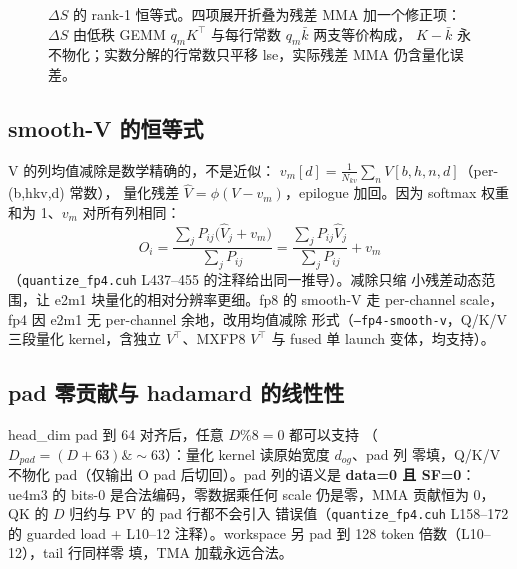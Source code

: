 \begin{figure}[H]
\caption{$\Delta S$ 的 rank-1 恒等式。四项展开折叠为残差 MMA 加一个修正项：
$\Delta S$ 由低秩 GEMM $q_mK^{\top}$ 与每行常数 $q_m\bar k$ 两支等价构成，
$K-\bar k$ 永不物化；实数分解的行常数只平移 lse，实际残差 MMA 仍含量化误差。}
\label{fig:31-deltas}
\end{figure}

\subsection{smooth-V 的恒等式}

V 的列均值减除是数学精确的，不是近似：
$v_m[d]=\frac{1}{N_{kv}}\sum_n V[b,h,n,d]$（per-(b,hkv,d) 常数），
量化残差 $\hat V=\phi(V-v_m)$，epilogue 加回。因为 softmax 权重和为
1、$v_m$ 对所有列相同：
\begin{equation}
  O_i=\frac{\sum_j P_{ij}\bigl(\hat V_j+v_m\bigr)}{\sum_j P_{ij}}
  =\frac{\sum_j P_{ij}\hat V_j}{\sum_j P_{ij}}+v_m
  \label{eq:31-smoothv}
\end{equation}
（\texttt{quantize\_fp4.cuh} L437--455 的注释给出同一推导）。减除只缩
小残差动态范围，让 e2m1 块量化的相对分辨率更细。fp8 的 smooth-V 走
per-channel scale，fp4 因 e2m1 无 per-channel 余地，改用均值减除
形式（\texttt{--fp4-smooth-v}，Q/K/V 三段量化 kernel，含独立
$V^\top$、MXFP8 $V^\top$ 与 fused 单 launch 变体，均支持）。

\subsection{pad 零贡献与 hadamard 的线性性}

head\_dim pad 到 64 对齐后，任意 $D\%8=0$ 都可以支持
（$D_{pad}=(D+63)\&\sim63$）：量化 kernel 读原始宽度 $d_{og}$、pad 列
零填，Q/K/V 不物化 pad（仅输出 O pad 后切回）。pad 列的语义是
\textbf{data=0 且 SF=0}：ue4m3 的 bits-0 是合法编码，零数据乘任何
scale 仍是零，MMA 贡献恒为 0，QK 的 $D$ 归约与 PV 的 pad 行都不会引入
错误值（\texttt{quantize\_fp4.cuh} L158--172 的 guarded load + L10--12
注释）。workspace 另 pad 到 128 token 倍数（L10--12），tail 行同样零
填，TMA 加载永远合法。

